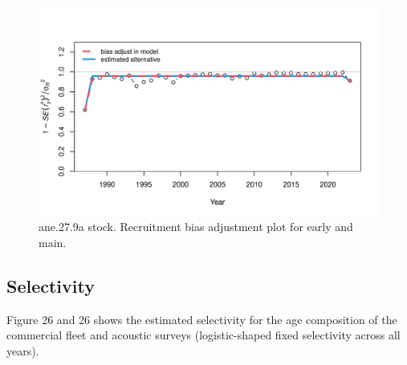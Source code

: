 \documentclass[
]{article}
\begin{document}
\begin{figure}[H]

{\centering \includegraphics[width=0.95\linewidth]{report/run/S1.0_4FLEETS/fig_recruit_fit_bias_adjust} 

}

\caption{ane.27.9a stock. Recruitment bias adjustment plot for early and main.}\label{fig:unnamed-chunk-34}
\end{figure}

\hypertarget{selectivity-1}{%
\subsection{Selectivity}\label{selectivity-1}}

Figure 26 and 26 shows the estimated selectivity for the age composition
of the commercial fleet and acoustic surveys (logistic-shaped fixed
selectivity across all years).
\end{document}
